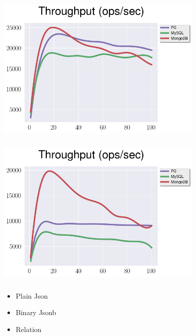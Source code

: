 \documentclass[usenames,dvipsnames, 18pt, compress, aspectratio=169]{beamer}
\begin{document}
\begin{frame}
    \frametitle{}
    \begin{center}

        \includegraphics[width=0.75\textwidth,center]{select.png}

    \end{center}
\end{frame}

\begin{frame}
    \frametitle{}
    \begin{center}

        \includegraphics[width=0.75\textwidth,center]{select_slice.png}

    \end{center}
\end{frame}

\begin{frame}
    \frametitle{}
    \begin{center}

        \begin{itemize}[label={\MVRightarrow}]
            \item Plain Json
            \item Binary Jsonb
            \item Relation
        \end{itemize}

    \end{center}
\end{frame}
\end{document}

